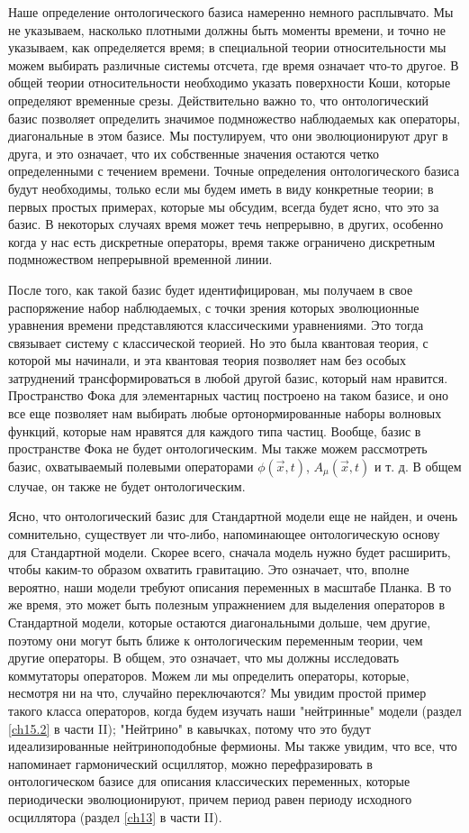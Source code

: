 \documentclass[main.tex]{subfiles}
\begin{document}
Наше определение онтологического базиса намеренно немного расплывчато. Мы не указываем, насколько плотными должны быть моменты времени, и точно не указываем, как определяется время; в специальной теории относительности мы можем выбирать различные системы отсчета, где время означает что-то другое. В общей теории относительности необходимо указать поверхности Коши, которые определяют временные срезы. Действительно важно то, что онтологический базис позволяет определить значимое подмножество наблюдаемых как операторы, диагональные в этом базисе. Мы постулируем, что они эволюционируют друг в друга, и это означает, что их собственные значения остаются четко определенными с течением времени. Точные определения онтологического базиса будут необходимы, только если мы будем иметь в виду конкретные теории; в первых простых примерах, которые мы обсудим, всегда будет ясно, что это за базис. В некоторых случаях время может течь непрерывно, в других, особенно когда у нас есть дискретные операторы, время также ограничено дискретным подмножеством непрерывной временной линии.

После того, как такой базис будет идентифицирован, мы получаем в свое распоряжение набор наблюдаемых, с точки зрения которых эволюционные уравнения времени представляются классическими уравнениями. Это тогда связывает систему с классической теорией. Но это была квантовая теория, с которой мы начинали, и эта квантовая теория позволяет нам без особых затруднений трансформироваться в любой другой базис, который нам нравится. Пространство Фока для элементарных частиц построено на таком базисе, и оно все еще позволяет нам выбирать любые ортонормированные наборы волновых функций, которые нам нравятся для каждого типа частиц. Вообще, базис в пространстве Фока не будет онтологическим. Мы также можем рассмотреть базис, охватываемый полевыми операторами $\phi(\vec x, t)$, $A_\mu(\vec x, t)$ и т. д. В общем случае, он также не будет онтологическим.

Ясно, что онтологический базис для Стандартной модели еще не найден, и очень сомнительно, существует ли что-либо, напоминающее онтологическую основу для Стандартной модели. Скорее всего, сначала модель нужно будет расширить, чтобы каким-то образом охватить гравитацию. Это означает, что, вполне вероятно, наши модели требуют описания переменных в масштабе Планка. В то же время, это может быть полезным упражнением для выделения операторов в Стандартной модели, которые остаются диагональными дольше, чем другие, поэтому они могут быть ближе к онтологическим переменным теории, чем другие операторы. В общем, это означает, что мы должны исследовать коммутаторы операторов. Можем ли мы определить операторы, которые, несмотря ни на что, случайно переключаются? Мы увидим простой пример такого класса операторов, когда будем изучать наши "нейтринные" модели (раздел \ref{ch15.2} в части II); "Нейтрино" в кавычках, потому что это будут идеализированные нейтриноподобные фермионы. Мы также увидим, что все, что напоминает гармонический осциллятор, можно перефразировать в онтологическом базисе для описания классических переменных, которые периодически эволюционируют, причем период равен периоду исходного осциллятора (раздел \ref{ch13} в части II).
\end{document}
